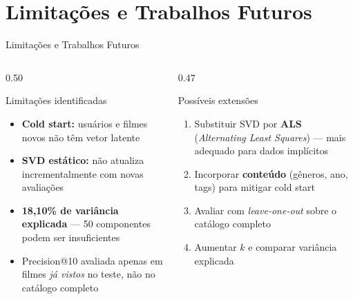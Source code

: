 \documentclass[aspectratio=169,10pt]{beamer}
\begin{document}
\section{Limitações e Trabalhos Futuros}

\begin{frame}{Limitações e Trabalhos Futuros}
  \begin{columns}[T]
    \begin{column}{0.50\textwidth}
      \begin{alertblock}{Limitações identificadas}
        \begin{itemize}
          \item \textbf{Cold start:} usuários e filmes novos não têm vetor latente
          \item \textbf{SVD estático:} não atualiza incrementalmente com novas avaliações
          \item \textbf{18,10\% de variância explicada} — 50 componentes podem ser insuficientes
          \item Precision@10 avaliada apenas em filmes \emph{já vistos} no teste, não no catálogo completo
        \end{itemize}
      \end{alertblock}
    \end{column}
    \begin{column}{0.47\textwidth}
      \begin{block}{Possíveis extensões}
        \begin{enumerate}
          \item Substituir SVD por \textbf{ALS} (\emph{Alternating Least Squares}) — mais adequado para dados implícitos
          \item Incorporar \textbf{conteúdo} (gêneros, ano, tags) para mitigar cold start
          \item Avaliar com \emph{leave-one-out} sobre o catálogo completo
          \item Aumentar $k$ e comparar variância explicada
        \end{enumerate}
      \end{block}
    \end{column}
  \end{columns}
\end{frame}

\end{document}
